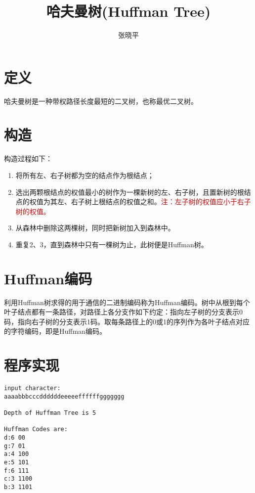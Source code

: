 \documentclass[10pt]{article}
\newcommand{\red}{\textcolor{red}}
\begin{document}
\renewcommand{\proofname}{\textbf{证明}}
\newtheorem{li}{例}
\newtheorem{jielun}{结论}
\newtheorem{dingli}{定理}
\newtheorem{mingti}{{命题}} 
\newtheorem{yinli}{{引理}} 
\newtheorem{tuilun}{{推论}}
\newtheorem{dingyi}{{定义}} 
\newtheorem*{jie}{{解}}
\newtheorem*{zhengming}{{证明}}
\newtheorem{zhu}{{注}}
\newtheorem*{zhu*}{{注}}
\newtheorem{xingzhi}{{性质}}
\newtheorem{wenti}{{问题}}

\title{哈夫曼树(Huffman Tree)}
\author{张晓平}
\maketitle

\section{定义}
哈夫曼树是一种带权路径长度最短的二叉树，也称最优二叉树。


\section{构造}
构造过程如下：
\begin{enumerate}
\item 将所有左、右子树都为空的结点作为根结点；
\item 选出两颗根结点的权值最小的树作为一棵新树的左、右子树，且置新树的根结点的权值为其左、右子树上根结点的权值之和。\red{注：左子树的权值应小于右子树的权值。}
\item 从森林中删除这两棵树，同时把新树加入到森林中。
\item 重复2、3，直到森林中只有一棵树为止，此树便是Huffman树。
\end{enumerate}


\section{Huffman编码}
利用Huffman树求得的用于通信的二进制编码称为Huffman编码。树中从根到每个叶子结点都有一条路径，对路径上各分支作如下约定：指向左子树的分支表示0码，指向右子树的分支表示1码。取每条路径上的0或1的序列作为各叶子结点对应的字符编码，即是Huffman编码。


\section{程序实现}







\begin{lstlisting}[title=运行结果,frame=single]
input character:
aaaabbbcccddddddeeeeeffffffggggggg

Depth of Huffman Tree is 5

Huffman Codes are:
d:6 00
g:7 01
a:4 100
e:5 101
f:6 111
c:3 1100
b:3 1101
\end{lstlisting}
\end{document}
